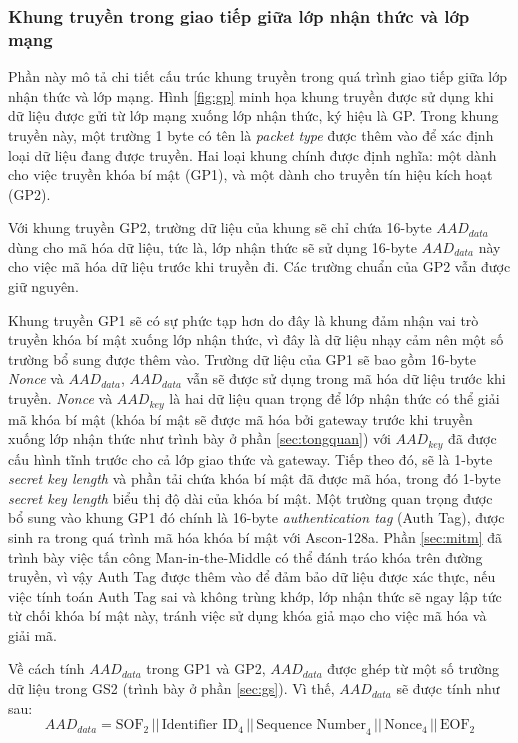 \subsubsection{Khung truyền trong giao tiếp giữa lớp nhận thức và lớp mạng}
Phần này mô tả chi tiết cấu trúc khung truyền trong quá trình giao tiếp giữa lớp nhận thức và lớp mạng. Hình \ref{fig:gp} minh họa khung truyền được sử dụng khi dữ liệu được gửi từ lớp mạng xuống lớp nhận thức, ký hiệu là GP. Trong khung truyền này, một trường 1 byte có tên là \textit{packet type} được thêm vào để xác định loại dữ liệu đang được truyền. Hai loại khung chính được định nghĩa: một dành cho việc truyền khóa bí mật (GP1), và một dành cho truyền tín hiệu kích hoạt (GP2). 

Với khung truyền GP2, trường dữ liệu của khung sẽ chỉ chứa 16-byte $AAD_{data}$ dùng cho mã hóa dữ liệu, tức là, lớp nhận thức sẽ sử dụng 16-byte $AAD_{data}$ này cho việc mã hóa dữ liệu trước khi truyền đi. Các trường chuẩn của GP2 vẫn được giữ nguyên.

Khung truyền GP1 sẽ có sự phức tạp hơn do đây là khung đảm nhận vai trò truyền khóa bí mật xuống lớp nhận thức, vì đây là dữ liệu nhạy cảm nên một số trường bổ sung được thêm vào. Trường dữ liệu của GP1 sẽ bao gồm 16-byte \textit{Nonce} và $AAD_{data}$, $AAD_{data}$ vẫn sẽ được sử dụng trong mã hóa dữ liệu trước khi truyền. \textit{Nonce} và $AAD_{key}$ là hai dữ liệu quan trọng để lớp nhận thức có thể giải mã khóa bí mật (khóa bí mật sẽ được mã hóa bởi gateway trước khi truyền xuống lớp nhận thức như trình bày ở phần \ref{sec:tongquan}) với $AAD_{key}$ đã được cấu hình tĩnh trước cho cả lớp giao thức và gateway. Tiếp theo đó, sẽ là 1-byte \textit{secret key length} và phần tải chứa khóa bí mật đã được mã hóa, trong đó 1-byte \textit{secret key length} biểu thị độ dài của khóa bí mật. Một trường quan trọng được bổ sung vào khung GP1 đó chính là 16-byte \textit{authentication tag} (Auth Tag), được sinh ra trong quá trình mã hóa khóa bí mật với Ascon-128a. Phần \ref{sec:mitm} đã trình bày việc tấn công Man-in-the-Middle có thể đánh tráo khóa trên đường truyền, vì vậy Auth Tag được thêm vào để đảm bảo dữ liệu được xác thực, nếu việc tính toán Auth Tag sai và không trùng khớp, lớp nhận thức sẽ ngay lập tức từ chối khóa bí mật này, tránh việc sử dụng khóa giả mạo cho việc mã hóa và giải mã.

Về cách tính $AAD_{data}$ trong GP1 và GP2, $AAD_{data}$ được ghép từ một số trường dữ liệu trong GS2 (trình bày ở phần \ref{sec:gs}). Vì thế, $AAD_{data}$ sẽ được tính như sau:
\[
\text{$AAD_{data}$} = \text{SOF}_{2} \, || \, \text{Identifier ID}_{4} \, || \, \text{Sequence Number}_{4} \, || \, \text{Nonce}_{4} \, || \, \text{EOF}_{2}
\]

